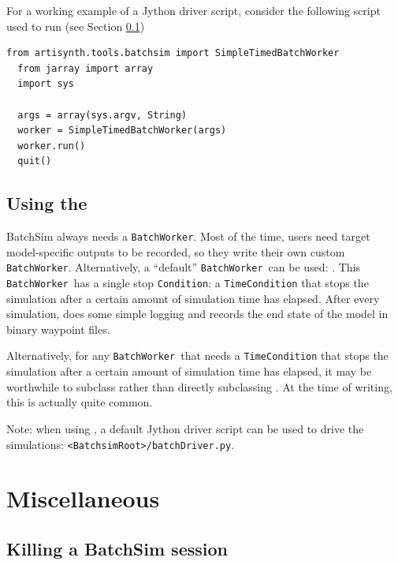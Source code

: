 \documentclass{article}
\newcommand{\BS}{<BatchsimRoot>}
\newcommand{\BW}{{\tt BatchWorker}}
\begin{document}
For a working example of a Jython driver script, consider the following script used to run  (see Section \ref{custom:STBW})

\begin{lstlisting}[]
  from artisynth.tools.batchsim import SimpleTimedBatchWorker
  from jarray import array
  import sys

  args = array(sys.argv, String)
  worker = SimpleTimedBatchWorker(args)
  worker.run()
  quit()
\end{lstlisting}

\subsection{Using the }
\label{custom:STBW}

BatchSim always needs a \BW. Most of the time, users need target model-specific outputs to be recorded, so they write their own custom \BW. Alternatively, a ``default'' \BW\ can be used: . This \BW\ has a single stop {\tt Condition}: a {\tt TimeCondition} that stops the simulation after a certain amount of simulation time has elapsed. After every simulation,  does some simple logging and records the end state of the model in binary waypoint files.

Alternatively, for any \BW\ that needs a {\tt TimeCondition} that stops the simulation after a certain amount of simulation time has elapsed, it may be worthwhile to subclass  rather than directly subclassing . At the time of writing, this is actually quite common.

\begin{sideblock}
Note: when using , a default Jython driver script can be used to drive the simulations: {\tt \BS/batchDriver.py}.
\end{sideblock}

\section{Miscellaneous}

\subsection{Killing a BatchSim session}
\label{misc:kill}
\end{document}
